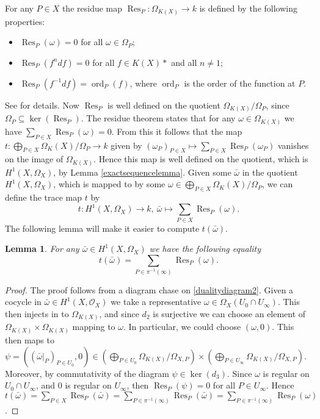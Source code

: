 \documentclass[draft, 11pt]{article} %
\theoremstyle{plain}
\newtheorem{lem}[defn]{Lemma}
\theoremstyle{remark}
\newcommand{\ra}{\rightarrow}
\newcommand{\hone}{H^1(X,\mathcal{O}_X)}
\DeclareMathOperator{\res}{Res}
\DeclareMathOperator{\ord}{ord}
\begin{document}
For any $P\in X$ the residue map $\res_P \colon \Omega_{K(X)} \ra k$ is defined by the following properties:
\begin{itemize}
\item $\res_P(\omega) = 0$ for all $\omega \in \Omega_{P}$;
\item $\res_P(f^ndf) = 0$ for all $f \in K(X)*$ and all $n \neq 1$;
\item $\res_P(f^{-1}df) = \ord_P(f)$, where $\ord_P$ is the order of the function at $P$.
\end{itemize}
See \cite[Chap III, Thm. 7.14.1]{hart} for details.
Now $\res_P$ is well defined on the quotient $\Omega_{K(X)}/\Omega_P$, since $\Omega_P \subseteq \ker (\res_P)$.
The residue theorem \cite[Chap. III, Thm. 7.14.2]{hart} states that for any $\omega \in \Omega_{K(X)}$ we have $\sum_{P\in X} \res_P(\omega) = 0$.
From this it follows that the map $t \colon \bigoplus_{P \in X} \Omega_K(X)/\Omega_P \ra k$ given by $(\omega_P)_{P \in X} \mapsto \sum_{P\in X} \res_P(\omega_P)$ vanishes on the image of $\Omega_{K(X)}$.
Hence this map is well defined on the quotient, which is $H^1(X,\Omega_X)$, by Lemma \ref{exactsequencelemma}.
Given some $\bar \omega$ in the quotient $H^1(X,\Omega_X)$, which is mapped to by some $\omega \in \bigoplus_{P \in X} \Omega_K(X)/\Omega_P$, we can define the trace map $t$ by
\[
t \colon H^1\left(X, \Omega_X\right) \ra k,\ \bar \omega \mapsto \sum_{P \in X} \res_P(\omega).
\]
The following lemma will make it easier to compute $t( \bar \omega)$.

\begin{lem}
For any $\bar \omega \in H^1(X,\Omega_X)$ we have the following equality
\[
t(\bar \omega) = \sum_{P \in \pi^{-1}(\infty)}\res_P(\omega).
\]
\end{lem}
\begin{proof}
The proof follows from a diagram chase on \eqref{dualitydiagram2}.
Given a cocycle in $\bar \omega \in \hone$ we take a representative $\omega \in \Omega_X(U_0 \cap U_\infty)$.
This then injects in to $\Omega_{K(X)}$, and since $d_2$ is surjective we can choose an element of $\Omega_{K(X)} \times \Omega_{K(X)}$ mapping to $\omega$.
In particular, we could choose $(\omega,0)$.
This then maps to $\psi = ((\bar{\omega}|_P)_{P\in U_0}, 0) \in \left( \bigoplus_{P \in U_0} \Omega_{K(X)}/\Omega_{X,P}\right) \times \left( \bigoplus_{P \in U_\infty} \Omega_{K(X)}/\Omega_{X,P} \right)$.
Moreover, by commutativity of the diagram $\psi \in \ker(d_3)$.
Since $\omega$ is regular on $U_0 \cap U_\infty$, and $0$ is regular on $U_\infty$, then $\res_P(\psi) = 0$ for all $P \in U_\infty$.
Hence $t(\bar \omega) = \sum_{P \in X}\res_P(\bar \omega) = \sum_{P \in \pi^{-1}(\infty)} \res_P(\bar \omega) = \sum_{P \in \pi^{-1}(\infty)} \res_P(\omega)$.
\end{proof}








\end{document}
